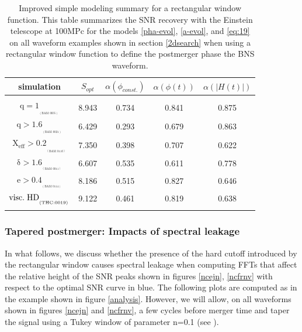 \begin{table}[!htbp]
\begin{center}

\begin{tabular}{ccccc}

simulation&$S_{opt}$&$\alpha(\phi_{const.})$&$\alpha(\phi(t))$&$\alpha(|H(t)|)$\\ 
\hline\\ 
$\mathrm{{q=1}_{_{_{(BAM:0035)}}}}$&8.943&0.734&0.841&0.875\\  
$\mathrm{{q>1.6}_{_{_{(BAM:0021)}}}}$&6.429&0.293&0.679&0.863\\  
$\mathrm{{X_{eff}>0.2}_{_{_{(BAM:0110)}}}}$&7.350&0.398&0.707&0.622\\  
$\mathrm{{\delta>1.6}_{_{_{(BAM:0011)}}}}$&6.607&0.535&0.611&0.778\\  
$\mathrm{{e>0.4}_{_{_{(BAM:0114)}}}}$&8.186&0.515&0.827&0.646\\  
$\mathrm{{visc.\hspace{1mm} HD}_{_{_{(THC:0019)}}}}$&9.122&0.461&0.819&0.638\\  
\hline\\ 
\end{tabular}
\captionsetup{width=0.8\textwidth}
\caption[Improved simple modeling summary for a rectangular window function]{Improved simple modeling summary for a rectangular window function. This table summarizes the SNR recovery with the Einstein telescope at 100MPc for the models \ref{pha-evol}, \ref{a-evol}, and \ref{eq:19} on all waveform examples shown in section \ref{2dsearch} when using a rectangular window function to define the postmerger phase the BNS waveform.}
\label{table untapered}
\end{center}
\end{table}
\FloatBarrier




\subsubsection*{Tapered postmerger: Impacts of spectral leakage}

In what follows, we discuss whether the presence of the hard cutoff introduced by the rectangular window causes spectral leakage when computing FFTs that affect the relative height of the SNR peaks shown in figures \ref{ncejn}, \ref{ncfrnv} with respect to the optimal SNR curve in blue. The following plots are computed as in the example shown in figure \ref{analysis}. However, we will allow, on all waveforms shown in figures \ref{ncejn} and \ref{ncfrnv}, a few cycles before merger time and taper the signal using a Tukey window of parameter n=0.1 (see \cite{bloomfield1976fourier}).


